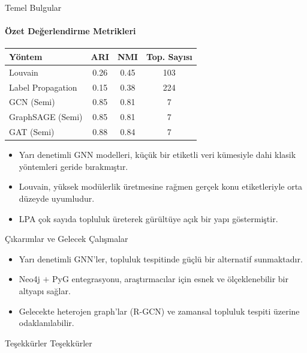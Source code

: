 \documentclass{beamer}
\begin{document}
\begin{frame}{Temel Bulgular}
\framesubtitle{Özet Değerlendirme Metrikleri}
    \centering
    \small
    \begin{tabular}{lccc}
        \hline
        Yöntem & ARI & NMI & Top. Sayısı \\\hline
        Louvain & 0.26 & 0.45 & 103 \\
        Label Propagation & 0.15 & 0.38 & 224 \\
        GCN (Semi) & 0.85 & 0.81 & 7 \\
        GraphSAGE (Semi) & 0.85 & 0.81 & 7 \\
        GAT (Semi) & 0.88 & 0.84 & 7 \\
        \hline
    \end{tabular}

    \vspace{0.3cm}
    \begin{itemize}
        \item Yarı denetimli GNN modelleri, küçük bir etiketli veri kümesiyle dahi klasik yöntemleri geride bırakmıştır.
        \item Louvain, yüksek modülerlik üretmesine rağmen gerçek konu etiketleriyle orta düzeyde uyumludur.
        \item LPA çok sayıda topluluk üreterek gürültüye açık bir yapı göstermiştir.
    \end{itemize}
\end{frame}

\begin{frame}{Çıkarımlar ve Gelecek Çalışmalar}
    \begin{itemize}
        \item Yarı denetimli GNN'ler, topluluk tespitinde güçlü bir alternatif sunmaktadır.
        \item Neo4j $+$ PyG entegrasyonu, araştırmacılar için esnek ve ölçeklenebilir bir altyapı sağlar.
        \item Gelecekte heterojen graph'lar (R-GCN) ve zamansal topluluk tespiti üzerine odaklanılabilir.
    \end{itemize}
\end{frame}

\begin{frame}{Teşekkürler}
    \centering
    \Huge
    Teşekkürler
\end{frame}
\end{document}
